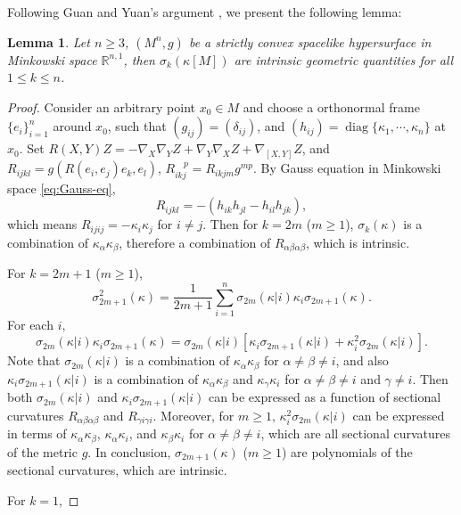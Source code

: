 \documentclass[reqno]{amsart}
\newtheorem{lemma}[theorem]{Lemma}
\theoremstyle{remark}
\newcommand{\R}{\ensuremath{\mathbb{R}}}
\newcommand{\diag}[1]{\ensuremath{\operatorname{diag}\{ #1 \}}}
\theoremstyle{definition}
\numberwithin{equation}{section}
\begin{document}
\bigskip

Following Guan and Yuan's argument \cite{guan2025-intrinsicality}, we present the following lemma: 
\begin{lemma}\label{lem:intrincity}
    Let \(n \geq 3\), \((M^n,g)\) be a strictly convex spacelike hypersurface in Minkowski space \(\R^{n,1}\), then \(\sigma_k(\kappa[M])\) are intrinsic geometric quantities for all \(1\leq k \leq n\). 
\end{lemma}
\begin{proof}
    Consider an arbitrary point \(x_0\in M\) and choose a orthonormal frame \(\{e_i\}_{i=1}^n\) around \(x_0\), such that \((g_{ij}) = (\delta_{ij})\), and \( (h_{ij})= \diag{\kappa_1,\cdots,\kappa_n}\) at \(x_0\). Set \({R}(X,Y)Z = -\nabla_X\nabla_Y Z + \nabla_Y\nabla_X Z + \nabla_{[X,Y]}Z\), and \({R}_{ijkl} = g(R(e_i,e_j)e_k,e_l)\), \( {R}_{ikj}^{\quad p} = {R}_{ikjm}g^{mp} \). By Gauss equation in Minkowski space \eqref{eq:Gauss-eq}, 
    \[ R_{ijkl} = -(h_{ik}h_{jl} - h_{il}h_{jk}), \]
    which means \(R_{ijij} = - \kappa_i \kappa_j\) for \(i\neq j\). Then for \(k=2m\) (\(m \geq 1\)), \(\sigma_k(\kappa)\) is a combination of \(\kappa_\alpha \kappa_\beta\), therefore a combination of \(R_{\alpha\beta\alpha\beta}\), which is intrinsic. 
    \par For \(k = 2m+1\) (\(m\geq 1\)), 
    \[ \sigma_{2m+1}^2(\kappa) = \frac{1}{2m+1}\sum_{i=1}^{n}\sigma_{2m}(\kappa|i)\kappa_i \sigma_{2m+1}(\kappa). \]
    For each \(i\), 
    \[ \sigma_{2m}(\kappa|i)\kappa_i \sigma_{2m+1}(\kappa) = \sigma_{2m}(\kappa|i)[\kappa_i\sigma_{2m+1}(\kappa|i) + \kappa_i^2\sigma_{2m}(\kappa|i)]. \]
    Note that \(\sigma_{2m}(\kappa|i)\) is a combination of \(\kappa_\alpha \kappa_{\beta}\) for \(\alpha\neq \beta \neq i\), and also \(\kappa_i\sigma_{2m+1}(\kappa|i)\) is a combination of \(\kappa_\alpha\kappa_\beta\) and \(\kappa_\gamma\kappa_i\) for \(\alpha\neq \beta\neq i\) and \(\gamma\neq i\). Then both \(\sigma_{2m}(\kappa|i)\) and \(\kappa_i\sigma_{2m+1}(\kappa|i)\) can be expressed as a function of sectional curvatures \(R_{\alpha\beta\alpha\beta}\) and \(R_{\gamma i \gamma i}\). Moreover, for \(m\geq 1\), \(\kappa_i^2 \sigma_{2m}(\kappa|i)\) can be expressed in terms of \(\kappa_\alpha \kappa_\beta\), \(\kappa_\alpha\kappa_i\), and \(\kappa_\beta\kappa_i\) for \(\alpha\neq\beta\neq i\), which are all sectional curvatures of the metric \(g\). In conclusion, \(\sigma_{2m+1}(\kappa)\) (\(m\geq 1\)) are polynomials of the sectional curvatures, which are intrinsic. 
    \par For \(k=1\), 

\end{proof}
\end{document}
